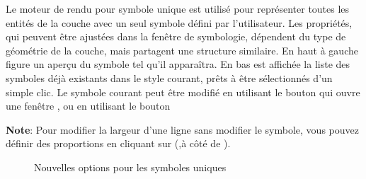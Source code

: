 Le moteur de rendu pour symbole unique est utilisé pour représenter toutes les entités de la couche avec un seul symbole défini par l'utilisateur. Les propriétés, qui peuvent être ajustées dans la fenêtre de symbologie, dépendent du type de géométrie de la couche, mais partagent une structure similaire. En haut à gauche figure un aperçu du symbole tel qu'il apparaîtra. En bas est affichée la liste des symboles déjà existants dans le style courant, prêts à être sélectionnés d'un simple clic. Le symbole courant peut être modifié en utilisant le bouton  qui ouvre une fenêtre , ou en utilisant le bouton 

\textbf{Note}: Pour modifier la largeur d'une ligne sans modifier le symbole, vous pouvez définir des proportions en cliquant sur (,à côté de 
).

\begin{figure}[ht]
\centering
   \hspace{1cm}
   \hspace{1cm}
\caption{Nouvelles options pour les symboles uniques \nixcaption}
\end{figure}

